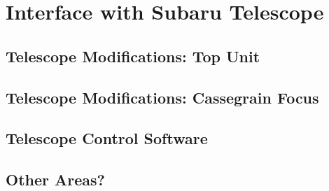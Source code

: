 \def\thisdir{development/telescope}

\chapter{Interface with Subaru Telescope
\label{chap:tel}}

\section{Telescope Modifications: Top Unit}

\section{Telescope Modifications: Cassegrain Focus}

\section{Telescope Control Software}

\section{Other Areas?}
